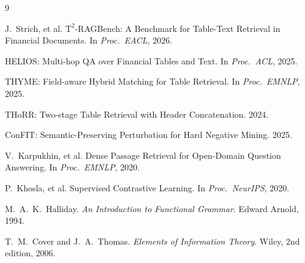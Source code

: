 \documentclass[10pt, a4paper]{article}
\begin{document}

\begin{thebibliography}{9}

J.~Strich, et al.
\newblock $\mathrm{T}^2$-RAGBench: A Benchmark for Table-Text Retrieval in Financial Documents.
\newblock In \textit{Proc.\ EACL}, 2026.

HELIOS: Multi-hop QA over Financial Tables and Text.
\newblock In \textit{Proc.\ ACL}, 2025.

THYME: Field-aware Hybrid Matching for Table Retrieval.
\newblock In \textit{Proc.\ EMNLP}, 2025.

THoRR: Two-stage Table Retrieval with Header Concatenation. 2024.

ConFIT: Semantic-Preserving Perturbation for Hard Negative Mining. 2025.

V.~Karpukhin, et al.
\newblock Dense Passage Retrieval for Open-Domain Question Answering.
\newblock In \textit{Proc.\ EMNLP}, 2020.

P.~Khosla, et al.
\newblock Supervised Contrastive Learning.
\newblock In \textit{Proc.\ NeurIPS}, 2020.

M.~A.~K.~Halliday.
\newblock \textit{An Introduction to Functional Grammar}.
\newblock Edward Arnold, 1994.

T.~M.~Cover and J.~A.~Thomas.
\newblock \textit{Elements of Information Theory}.
\newblock Wiley, 2nd edition, 2006.

\end{thebibliography}
\end{document}
